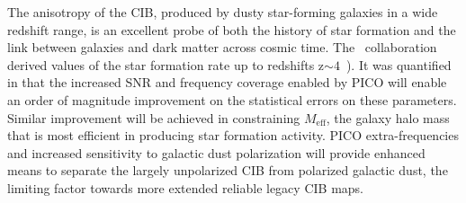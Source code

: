 \documentclass[PICOReport.tex]{subfiles}
\begin{document}
The anisotropy of the \ac{CIB}, produced by dusty star-forming galaxies in a wide redshift range, is an excellent probe of both the history of star formation and the link between
galaxies and dark matter across cosmic time. The \planck\ collaboration derived values of the star formation rate up to redshifts z$\mathrm{\sim 4}$~\cite{2014A&A...571A..30P,2014A&A...571A..18P,madau2014}).
It was quantified in \cite{Wu:2016hej} that the increased \ac{SNR} and frequency coverage enabled by PICO will enable an order of magnitude improvement on the statistical errors on these parameters.
Similar improvement will be achieved in constraining $M_{\mathrm{eff}}$, the galaxy halo mass that is most efficient in producing star formation activity. PICO extra-frequencies and increased sensitivity to galactic dust polarization will provide enhanced means to separate the largely unpolarized \ac{CIB} from polarized galactic dust, the limiting factor towards more extended reliable legacy \ac{CIB} maps.


\end{document}
